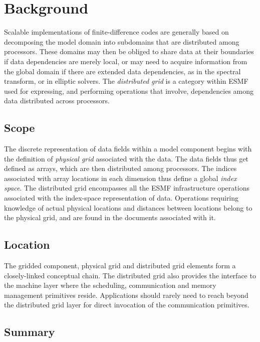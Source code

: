 
\section{Background}

Scalable implementations of finite-difference codes are generally
based on decomposing the model domain into subdomains that are
distributed among processors. These domains may then be obliged to
share data at their boundaries if data dependencies are merely
local, or may need to acquire information from the global domain if
there are extended data dependencies, as in the spectral transform, or
in elliptic solvers. The \emph{distributed grid} 
is a category within ESMF used for expressing, and
performing operations that involve, dependencies among data
distributed across processors.

\subsection{Scope}

The discrete representation of data fields within a model component
begins with the definition of \emph{physical grid} associated with the
data. The data fields thus get defined as arrays, which are then
distributed among processors. The indices associated with array
locations in each dimension thus define a global \emph{index space}. The
distributed grid encompasses all the ESMF infrastructure operations
associated with the index-space representation of data. Operations
requiring knowledge of actual physical locations and distances between
locations belong to the physical grid, and are found in the
documents associated with it.

\subsection{Location}

The gridded component, physical grid and distributed grid
elements form a closely-linked conceptual chain. The distributed grid also
provides the interface to the machine layer where the scheduling,
communication and memory management primitives reside. Applications
should rarely need to reach beyond the distributed grid layer for
direct invocation of the communication primitives.


\subsection{Summary}

